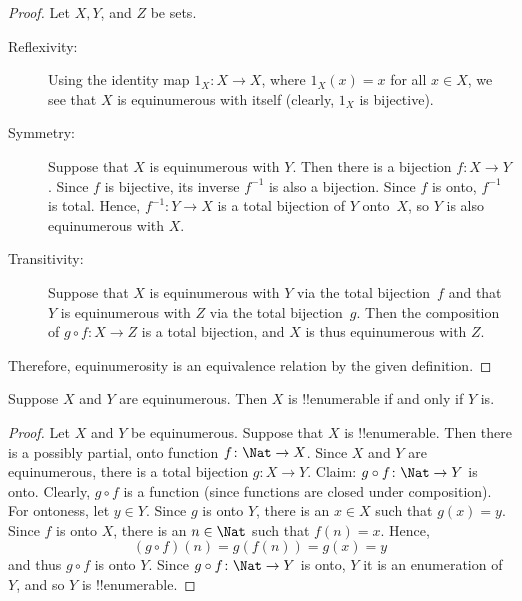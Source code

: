 \documentclass[../../include/open-logic-section]{subfiles}
\begin{document}
\begin{proof} Let $X, Y$, and $Z$ be sets.

\begin{description}

\item[Reflexivity:] Using the identity map $1_X \colon X \rightarrow
  X$, where $1_X (x) = x$ for all $x \in X$, we see
  that $X$ is equinumerous with itself (clearly, $1_X$ is bijective).

\item[Symmetry:] Suppose that $X$ is equinumerous with $Y$. Then there
  is a bijection $f\colon X \rightarrow Y$. Since $f$ is bijective,
  its inverse $f^{-1}$ is also a bijection. Since $f$ is onto,
  $f^{-1}$ is total. Hence, $f^{-1}\colon Y \rightarrow X$ is a total
  bijection of $Y$ onto~$X$, so $Y$ is also equinumerous with $X$.

\item[Transitivity:] Suppose that $X$ is equinumerous with $Y$ via the
  total bijection~$f$ and that $Y$ is equinumerous with $Z$ via the
  total bijection~$g$. Then the composition of $g \circ f \colon X
  \rightarrow Z$ is a total bijection, and $X$ is thus equinumerous
  with $Z$.
\end{description}
Therefore, equinumerosity is an equivalence relation by the given definition.
\end{proof}

\begin{thm}
Suppose $X$ and $Y$ are equinumerous. Then $X$ is !!{enumerable} if
and only if $Y$ is.
\end{thm}

\begin{proof}
Let $X$ and $Y$ be equinumerous.  Suppose that $X$ is
!!{enumerable}. Then there is a possibly partial, onto function
$f\colon \Nat \to X$. Since $X$ and $Y$ are equinumerous, there is a
total bijection $g\colon X \to Y$. Claim: $g \circ f \colon \Nat
\rightarrow Y$ is onto. Clearly, $g \circ f$ is a function (since
functions are closed under composition). For ontoness, let $y \in
Y$. Since $g$ is onto $Y$, there is an $x \in X$ such that $g(x) =
y$. Since $f$ is onto $X$, there is an $n \in \Nat$ such that $f(n) =
x$. Hence,
\[ 
(g \circ f)(n) = g(f(n)) = g(x) = y 
\]
and thus $g \circ f$ is onto $Y$. Since $g \circ f\colon \Nat \to Y$
is onto, $Y$ it is an enumeration of~$Y$, and so $Y$ is
!!{enumerable}.
\end{proof}
\end{document}
